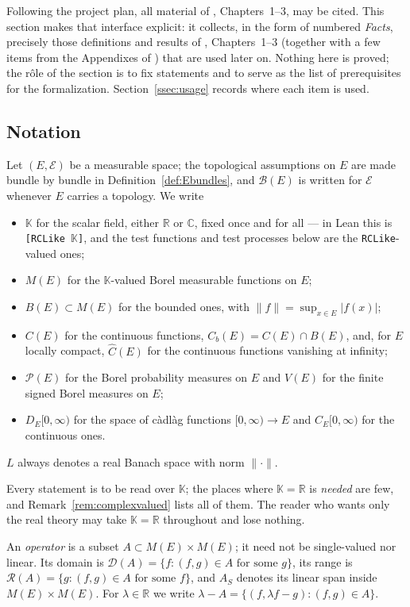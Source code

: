 \documentclass[11pt,a4paper]{article}
\theoremstyle{plain}
\theoremstyle{definition}
\theoremstyle{remark}
\newcommand{\R}{\mathbb{R}}
\newcommand{\Bor}{\mathcal{B}}                 %
\newcommand{\Meas}{M}                          %
\newcommand{\Bdd}{B}                           %
\newcommand{\Cb}{C_b}                          %
\newcommand{\Prob}{\mathcal{P}}                %
\newcommand{\DE}{D_E[0,\infty)}
\newcommand{\CE}{C_E[0,\infty)}
\newcommand{\dom}{\mathcal{D}}                 %
\newcommand{\ran}{\mathcal{R}}                 %
\newcommand{\K}{\mathbb{K}}
\newcommand{\C}{\mathbb{C}}
\newcommand{\Chat}{\hat{C}}                    %
\newcommand{\Vsig}{V}                          %
\newcommand{\Lsp}{L}                           %
\newcommand{\EK}{\cite{EK86}}
\begin{document}
Following the project plan, all material of \EK, Chapters~1--3, may be cited.
This section makes that interface explicit: it collects, in the form of
numbered \emph{Facts}, precisely those definitions and results of
\EK, Chapters~1--3 (together with a few items from the Appendixes of \EK) that
are used later on.  Nothing here is proved; the r\^ole of the section is to fix
statements and to serve as the list of prerequisites for the formalization.
Section~\ref{ssec:usage} records where each item is used.

\subsection{Notation}
\label{ssec:notation}

Let $(E,\mathcal{E})$ be a measurable space; the topological assumptions on $E$
are made bundle by bundle in Definition~\ref{def:Ebundles}, and $\Bor(E)$ is
written for $\mathcal{E}$ whenever $E$ carries a topology.  We write
\begin{itemize}[nosep]
\item $\K$ for the scalar field, either $\R$ or $\C$, fixed once and for all ---
  in Lean this is \texttt{[RCLike \(\mathbb{K}\)]}, and the test functions and
  test processes below are the \texttt{RCLike}-valued ones;
\item $\Meas(E)$ for the $\K$-valued Borel measurable functions on $E$;
\item $\Bdd(E) \subset \Meas(E)$ for the bounded ones, with
  $\lVert f\rVert = \sup_{x \in E} |f(x)|$;
\item $C(E)$ for the continuous functions, $\Cb(E) = C(E) \cap \Bdd(E)$, and,
  for $E$ locally compact, $\Chat(E)$ for the continuous functions vanishing at
  infinity;
\item $\Prob(E)$ for the Borel probability measures on $E$ and $\Vsig(E)$ for the
  finite signed Borel measures on $E$;
\item $\DE$ for the space of c\`adl\`ag functions $[0,\infty) \to E$ and $\CE$
  for the continuous ones.
\end{itemize}
$\Lsp$ always denotes a real Banach space with norm $\lVert \cdot \rVert$.

Every statement is to be read over $\K$; the places where $\K = \R$ is
\emph{needed} are few, and Remark~\ref{rem:complexvalued} lists all of them.
The reader who wants only the real theory may take $\K = \R$ throughout and lose
nothing.

An \emph{operator} is a subset $A \subset \Meas(E) \times \Meas(E)$; it need not
be single-valued nor linear.  Its domain is
$\dom(A) = \{f : (f,g) \in A \text{ for some } g\}$, its range is
$\ran(A) = \{g : (f,g) \in A \text{ for some } f\}$, and $A_S$ denotes its linear
span inside $\Meas(E) \times \Meas(E)$.  For $\lambda \in \R$ we write
$\lambda - A = \{ (f, \lambda f - g) : (f,g) \in A \}$.
\end{document}
